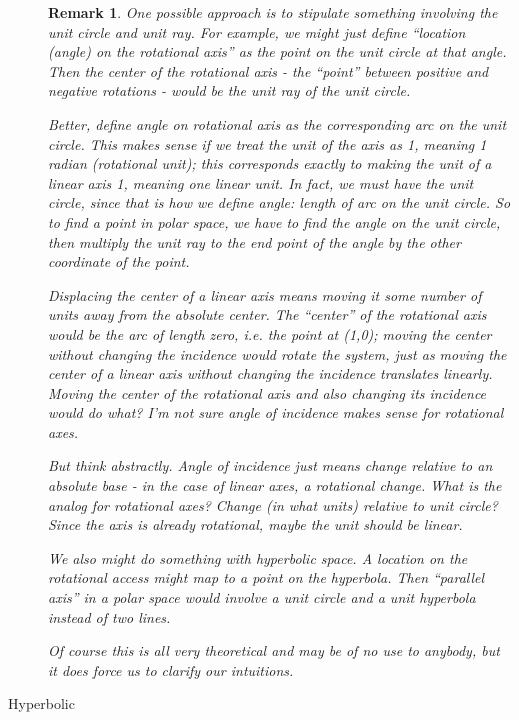 \documentclass[12pt]{tufte-handout}
\numberwithin{equation}{subsection}
\numberwithin{equation}{subsection}
\newtheorem{remark}{Remark}
\begin{document}
\begin{description}
\begin{remark}
      One possible approach is to stipulate something involving the
      unit circle and unit ray.  For example, we might just define
      ``location (angle) on the rotational axis'' as the point on
      the unit circle at that angle.  Then the center of the
      rotational axis - the ``point'' between positive and negative
      rotations - would be the unit ray of the unit circle.

      Better, define angle on rotational axis as the corresponding
      arc on the unit circle.  This makes sense if we treat the unit
      of the axis as 1, meaning 1 radian (rotational unit); this
      corresponds exactly to making the unit of a linear axis 1,
      meaning one linear unit.  In fact, we must have the unit
      circle, since that is how we define angle: length of arc on
      the unit circle.  So to find a point in polar space, we have
      to find the angle on the unit circle, then multiply the unit
      ray to the end point of the angle by the other coordinate of
      the point.

      Displacing the center of a linear axis means moving it some
      number of units away from the absolute center.  The ``center''
      of the rotational axis would be the arc of length zero,
      i.e. the point at (1,0); moving the center without changing
      the incidence would rotate the system, just as moving the
      center of a linear axis without changing the incidence
      translates linearly.  Moving the center of the rotational axis
      and also changing its incidence would do what?  I'm not sure
      angle of incidence makes sense for rotational axes.

      But think abstractly.  Angle of incidence just means change
      relative to an absolute base - in the case of linear axes, a
      rotational change.  What is the analog for rotational axes?
      Change (in what units) relative to unit circle?  Since the
      axis is already rotational, maybe the unit should be linear.

      We also might do something with hyperbolic space.  A location
      on the rotational access might map to a point on the
      hyperbola.  Then ``parallel axis'' in a polar space would
      involve a unit circle and a unit hyperbola instead of two
      lines.

      Of course this is all very theoretical and may be of no use to
      anybody, but it does force us to clarify our intuitions.
    \end{remark}

  \item[Hyperbolic]

  \end{description}
\end{document}
